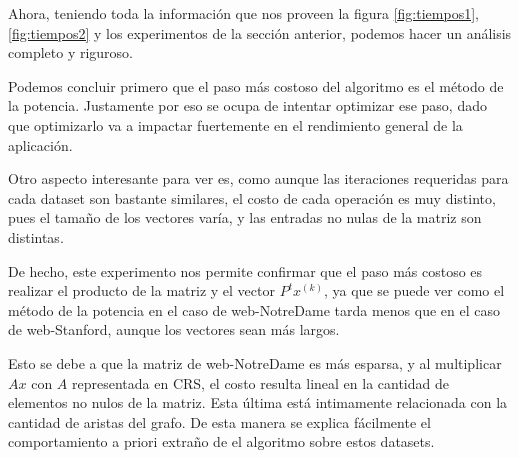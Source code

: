 Ahora, teniendo toda la información que nos proveen la figura \ref{fig:tiempos1}, \ref{fig:tiempos2} y los experimentos de la sección anterior, podemos hacer un análisis completo y riguroso.

Podemos concluir primero que el paso más costoso del algoritmo es el método de la potencia. Justamente por eso \cite{Kamvar2003} se ocupa de intentar optimizar ese paso, dado que optimizarlo va a impactar fuertemente en el rendimiento general de la aplicación.


Otro aspecto interesante para ver es, como aunque las iteraciones requeridas para cada dataset son bastante similares, el costo de cada operación es muy distinto, pues el tamaño de los vectores varía, y las entradas no nulas de la matriz son distintas. 

De hecho, este experimento nos permite confirmar que el paso más costoso es realizar el producto de la matriz y el vector $P^t x^{(k)}$, ya que se puede ver como el método de la potencia en el caso de web-NotreDame tarda menos que en el caso de web-Stanford, aunque los vectores sean más largos. 

Esto se debe a que la matriz de web-NotreDame es más esparsa, y al multiplicar $Ax$ con $A$ representada en CRS, el costo resulta lineal en la cantidad de elementos no nulos de la matriz. Esta última está intimamente relacionada con la cantidad de aristas del grafo. De esta manera se explica fácilmente el comportamiento a priori extraño de el algoritmo sobre estos datasets.

